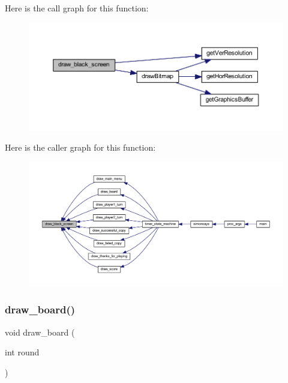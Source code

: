 Here is the call graph for this function\+:\nopagebreak
\begin{figure}[H]
\begin{center}
\leavevmode
\includegraphics[width=350pt]{group___bitmap_ga66c6cdf9473527bd3dcbab53d147d5b9_cgraph}
\end{center}
\end{figure}
Here is the caller graph for this function\+:\nopagebreak
\begin{figure}[H]
\begin{center}
\leavevmode
\includegraphics[width=350pt]{group___bitmap_ga66c6cdf9473527bd3dcbab53d147d5b9_icgraph}
\end{center}
\end{figure}
\mbox{\label{group___bitmap_gaa7519d8a181750afa183c3350c5f9598}} 
\subsubsection{\texorpdfstring{draw\+\_\+board()}{draw\_board()}}
{\footnotesize\ttfamily void draw\+\_\+board (\begin{DoxyParamCaption}\item[{int}]{round }\end{DoxyParamCaption})}



